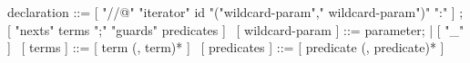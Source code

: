 \begin{syntax}
  declaration ::= [ "//@" "iterator" id "("wildcard-param","
    wildcard-param")" ":" ] ;
  [ "nexts" terms ";" "guards" predicates ]
  \
  [ wildcard-param ] ::= parameter;
  | [ "_" ]
  \
  [ terms ] ::= [ term (, term)* ]
  \
  [ predicates ] ::= [ predicate (, predicate)* ]
\end{syntax}
